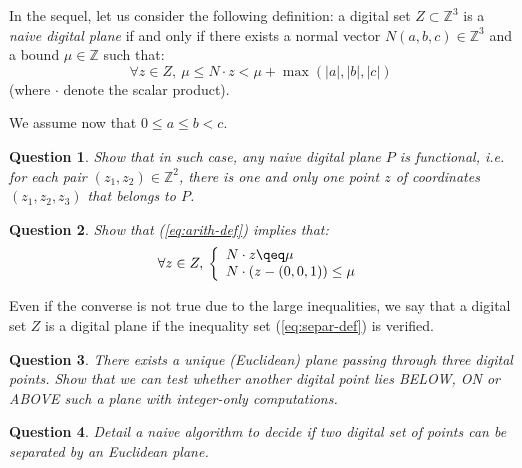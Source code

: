 \documentclass[a4paper, 11pt]{article}
\newtheorem{qu}{Question}
\begin{document}
In the sequel, let us consider the following definition: 
a digital set $Z \subset \mathbb{Z}^3$ is a \emph{naive digital plane} if and only if 
there exists a normal vector $N(a,b,c) \in \mathbb{Z}^3$ and 
a bound $\mu \in \mathbb{Z}$ such that:
\begin{equation}
\label{eq:arith-def}
    \forall z \in Z, \: \mu \leq N \cdot z < \mu + \max{(|a|,|b|,|c|)}
\end{equation}
(where $\cdot$ denote the scalar product). 

We assume now that $0 \leq a \leq b < c$.

\begin{qu}
Show that in such case, any naive digital plane $P$ is functional, i.e. 
for each pair $(z_1, z_2) \in \mathbb{Z}^2$, there is one and only one
 point $z$ of coordinates $(z_1,z_2,z_3)$ that belongs to $P$. 
\end{qu}

\begin{qu}
Show that (\ref{eq:arith-def}) implies that: 
\begin{equation}
\label{eq:separ-def}
\forall z \in Z, \:
  \left\{
  \begin{array}{l}
     N \cdot z \qeq \mu  \\
     N \cdot (z-(0,0,1)) \leq \mu  \\
  \end{array}
  \right.
\end{equation} 
\end{qu}

Even if the converse is not true due to the large inequalities, we say
that a digital set $Z$ is a digital plane if the inequality set
(\ref{eq:separ-def}) is verified.

\begin{qu}
There exists a unique (Euclidean) plane passing through three digital
points. Show that we can test whether another digital point lies
BELOW, ON or ABOVE such a plane with integer-only computations.
\end{qu}

\begin{qu}
Detail a naive algorithm to decide if two digital set of points can
be separated by an Euclidean plane.
\end{qu}

\end{document}
